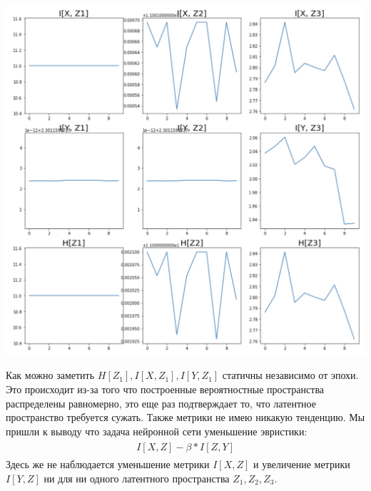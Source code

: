 \begin{center}
    \includegraphics[scale=0.45]{images/inf_without_comp.png}
\end{center}
Как можно заметить $H[Z_1], I[X, Z_1], I[Y,Z_1]$ статичны независимо от эпохи. Это происходит из-за того что построенные вероятностные пространства распределены равномерно, это еще раз подтверждает то, что латентное пространство требуется сужать. Также метрики не имею никакую тенденцию. Мы пришли к выводу что задача нейронной сети уменьшение эвристики: 
\begin{gather}
\begin{aligned}
I[X, Z] - \beta * I[Z, Y]
\end{aligned}
\end{gather}
Здесь же не наблюдается уменьшение метрики $I[X, Z]$ и увеличение метрики $I[Y, Z]$ ни для ни одного латентного пространства $Z_1, Z_2, Z_3$.
